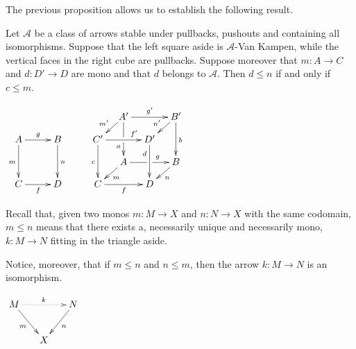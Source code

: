 \documentclass[a4paper,UKenglish,cleveref,pdftex,thm-restate,numberwithinsect]{lipics-v2021}
\def\C{\textbf {\textup{C}}}
\begin{document}
The previous proposition allows us to establish the following result.

\noindent \parbox{7.4cm}{
\begin{lemma}\label{lem:varie}Let $\mathcal{A}$ be a class of arrows stable under pullbacks, pushouts and containing all isomorphisms.  Suppose that the left square aside is $\mathcal{A}$-Van Kampen, while the vertical faces in the right cube are pullbacks. 	Suppose moreover that $m\colon A\to C$ and $d\colon D'\to D$ are mono and that $d$ belongs to $\mathcal{A}$. Then $d\leq n$ if and only if $c \leq m$.
\end{lemma}}
	\parbox{6cm}{$\xymatrix@C=10pt@R=10pt{&&&&&A'\ar[dd]|\hole_(.65){a}\ar[rr]^{g'} \ar[dl]_{m'} && B' \ar[dd]^{b} \ar[dl]_{n'} \\ A \ar[dd]_{m}\ar[rr]^{g}&&B\ar[dd]^{n}&&C'  \ar[dd]_{c}\ar[rr]^(.7){f'} & & D' \ar[dd]_(.3){d}\\&&&&&A\ar[rr]|\hole^(.65){g} \ar[dl]^{m} && B \ar[dl]^{n} \\C\ar[rr]_{f} &&D&&C \ar[rr]_{f} & & D}$}

\noindent 
\parbox{11cm}{\begin{remark}
	Recall that, given two monos $m:M\to X$ and $n:N\to X$ with the same codomain, $m\leq n$ means that there exists a, necessarily unique and necessarily mono, $k:M\to N$ fitting in the triangle aside.	
	
	\hspace{15pt}Notice, moreover, that  if $m\leq n$ and $n\leq m$, then the arrow $k:M\to N$ is an isomorphism.
\end{remark}}
\parbox{4cm}{$\xymatrix@C=15pt{M\ar@{.>}[rr]^{k}  \ar[dr]_{m}&& N \ar[dl]^{n}\\ & X}$}\\
\end{document}
